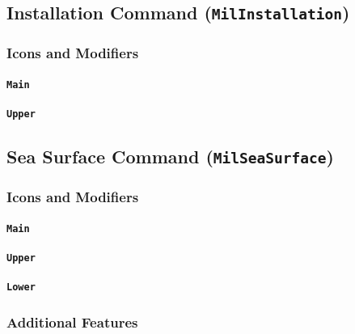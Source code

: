 \documentclass[a4paper, titlepage]{article}
\begin{document}
\subsection{Installation Command (\textbf{\texttt{MilInstallation}})}

\subsubsection{Icons and Modifiers}

\paragraph{\texttt{Main}}
%

\paragraph{\texttt{Upper}}
%

\subsection{Sea Surface Command (\textbf{\texttt{MilSeaSurface}})}

\subsubsection{Icons and Modifiers}

\paragraph{\texttt{Main}}
%

\paragraph{\texttt{Upper}}
%

\paragraph{\texttt{Lower}}
%

\subsubsection{Additional Features}
\end{document}

